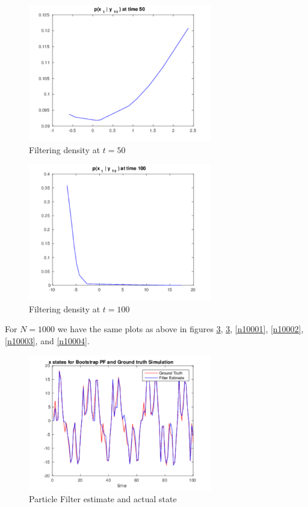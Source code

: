 \documentclass[11pt]{article}
\begin{document}
\begin{figure}[h]
  
  \centering
    \includegraphics[width=80mm]{../figs/011_15_t50N10.pdf}
    \caption{Filtering density at $t=50$}
    \label{n103}
\end{figure}

\begin{figure}[h]
  
  \centering
    \includegraphics[width=80mm]{../figs/012_15_t100N10.pdf}
    \caption{Filtering density at $t=100$}
    \label{n104}
\end{figure}


For $N=1000$ we have the same plots as above in figures \ref{n1000gtbt}, \ref{n1000gtbt}, \ref{n10001}, \ref{n10002}, \ref{n10003}, and \ref{n10004}.

\begin{figure}[h]
  
  \centering
    \includegraphics[width=80mm]{../figs/013_15_gt-and-bt.pdf}
    \caption{Particle Filter estimate and actual state}
    \label{n1000gtbt}
\end{figure}
\end{document}
